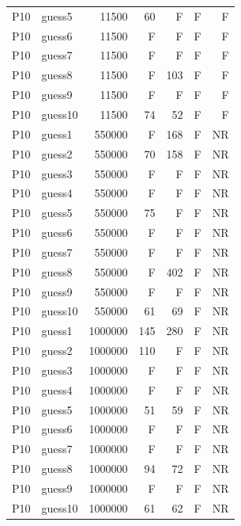 {\begin{longtable}{llrrrrr}
P10 & guess5 & 11500 & 60 & F & F & F \\
P10 & guess6 & 11500 & F & F & F & F \\
P10 & guess7 & 11500 & F & F & F & F \\
P10 & guess8 & 11500 & F & 103 & F & F \\
P10 & guess9 & 11500 & F & F & F & F \\
P10 & guess10 & 11500 & 74 & 52 & F & F \\
P10 & guess1 & 550000 & F & 168 & F & NR \\
P10 & guess2 & 550000 & 70 & 158 & F & NR \\
P10 & guess3 & 550000 & F & F & F & NR \\
P10 & guess4 & 550000 & F & F & F & NR \\
P10 & guess5 & 550000 & 75 & F & F & NR \\
P10 & guess6 & 550000 & F & F & F & NR \\
P10 & guess7 & 550000 & F & F & F & NR \\
P10 & guess8 & 550000 & F & 402 & F & NR \\
P10 & guess9 & 550000 & F & F & F & NR \\
P10 & guess10 & 550000 & 61 & 69 & F & NR \\
P10 & guess1 & 1000000 & 145 & 280 & F & NR \\
P10 & guess2 & 1000000 & 110 & F & F & NR \\
P10 & guess3 & 1000000 & F & F & F & NR \\
P10 & guess4 & 1000000 & F & F & F & NR \\
P10 & guess5 & 1000000 & 51 & 59 & F & NR \\
P10 & guess6 & 1000000 & F & F & F & NR \\
P10 & guess7 & 1000000 & F & F & F & NR \\
P10 & guess8 & 1000000 & 94 & 72 & F & NR \\
P10 & guess9 & 1000000 & F & F & F & NR \\
P10 & guess10 & 1000000 & 61 & 62 & F & NR \\
\end{longtable}}

